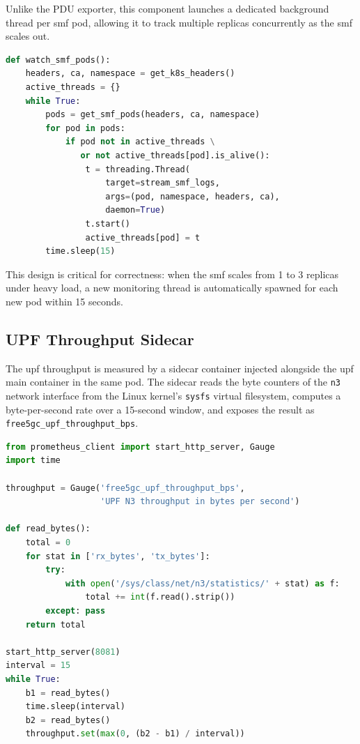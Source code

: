 Unlike the PDU exporter, this component launches a dedicated background thread per \gls{smf} pod, allowing it to track multiple replicas concurrently as the \gls{smf} scales out.

\begin{lstlisting}[language=python, caption={Multi-threaded SMF pod monitoring (smf-request-exporter.py)}, label={lst:smf_exporter}]
def watch_smf_pods():
    headers, ca, namespace = get_k8s_headers()
    active_threads = {}
    while True:
        pods = get_smf_pods(headers, ca, namespace)
        for pod in pods:
            if pod not in active_threads \
               or not active_threads[pod].is_alive():
                t = threading.Thread(
                    target=stream_smf_logs,
                    args=(pod, namespace, headers, ca),
                    daemon=True)
                t.start()
                active_threads[pod] = t
        time.sleep(15)
\end{lstlisting}

This design is critical for correctness: when the \gls{smf} scales from 1 to 3 replicas under heavy load, a new monitoring thread is automatically spawned for each new pod within 15 seconds.

\subsection{UPF Throughput Sidecar}
\label{sec:upf_sidecar}

The \gls{upf} throughput is measured by a sidecar container injected alongside the \gls{upf} main container in the same pod. The sidecar reads the byte counters of the \texttt{n3} network interface from the Linux kernel's \texttt{sysfs} virtual filesystem, computes a byte-per-second rate over a 15-second window, and exposes the result as \texttt{free5gc\_upf\_throughput\_bps}.

\begin{lstlisting}[language=python, caption={UPF N3 interface throughput measurement (sidecar.py)}, label={lst:upf_sidecar}]
from prometheus_client import start_http_server, Gauge
import time

throughput = Gauge('free5gc_upf_throughput_bps',
                   'UPF N3 throughput in bytes per second')

def read_bytes():
    total = 0
    for stat in ['rx_bytes', 'tx_bytes']:
        try:
            with open('/sys/class/net/n3/statistics/' + stat) as f:
                total += int(f.read().strip())
        except: pass
    return total

start_http_server(8081)
interval = 15
while True:
    b1 = read_bytes()
    time.sleep(interval)
    b2 = read_bytes()
    throughput.set(max(0, (b2 - b1) / interval))
\end{lstlisting}

